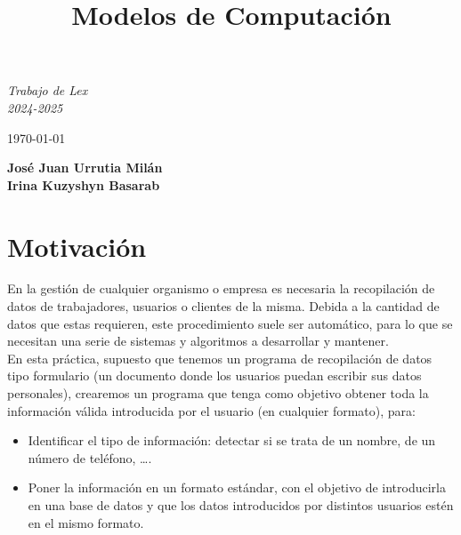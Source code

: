 \documentclass[12pt]{article}
\title{\textbf{Modelos de Computación}}
\date{}  %
\begin{document}
    \maketitle

    \begin{center}
        \LARGE \textit{Trabajo de Lex\\2024-2025}
    \end{center}

    \vspace{1cm}

    \begin{center}
        \large \today
    \end{center}
    
    \vspace{8cm}

    \begin{center}
        \textbf{José Juan Urrutia Milán} \\ 
        \vspace{1em}  %
        \textbf{Irina Kuzyshyn Basarab} \\ 
    \end{center}

    \newpage

    \section{Motivación}
    En la gestión de cualquier organismo o empresa es necesaria la recopilación de datos de trabajadores, usuarios o clientes de la misma. Debida a la cantidad de datos que estas requieren, este procedimiento suele ser automático, para lo que se necesitan una serie de sistemas y algoritmos a desarrollar y mantener.\\

    En esta práctica, supuesto que tenemos un programa de recopilación de datos tipo formulario (un documento donde los usuarios puedan escribir sus datos personales), crearemos un programa que tenga como objetivo obtener toda la información válida introducida por el usuario (en cualquier formato), para:
    \begin{itemize}
        \item Identificar el tipo de información: detectar si se trata de un nombre, de un número de teléfono, \ldots.
        \item Poner la información en un formato estándar, con el objetivo de introducirla en una base de datos y que los datos introducidos por distintos usuarios estén en el mismo formato. 
    \end{itemize}
\end{document}
